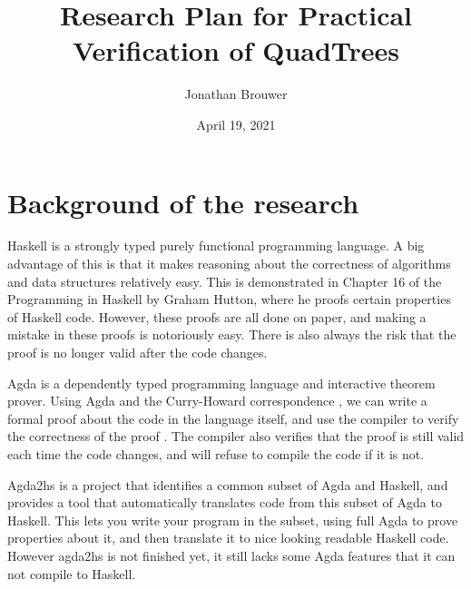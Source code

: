 \documentclass[english]{article}
\title{Research Plan for Practical Verification of QuadTrees}
\author{Jonathan Brouwer}
\date{April 19, 2021}
\begin{document}
\maketitle



\section*{Background of the research}
Haskell \cite{haskell} is a strongly typed purely functional programming language. A big advantage of this is that it makes reasoning about the correctness of algorithms and data structures relatively easy. This is demonstrated in Chapter 16 of the Programming in Haskell by Graham Hutton, where he proofs certain properties of Haskell code. However, these proofs are all done on paper, and making a mistake in these proofs is notoriously easy. There is also always the risk that the proof is no longer valid after the code changes.

Agda \cite{agda} is a dependently typed programming language and interactive theorem prover.  Using Agda and the Curry-Howard correspondence \cite{chc}, we can write a formal proof about the code in the language itself, and use the compiler to verify the correctness of the proof \cite{schwaab}\cite{van}. The compiler also verifies that the proof is still valid each time the code changes, and will refuse to compile the code if it is not.

Agda2hs \cite{agda2hs} is a project that identifies a common subset of Agda and Haskell, and provides a tool that automatically translates code from this subset of Agda to Haskell. This lets you write your program in the subset, using full Agda to prove properties about it, and then translate it to nice looking readable Haskell code. However agda2hs is not finished yet, it still lacks some Agda features that it can not compile to Haskell.
\end{document}
